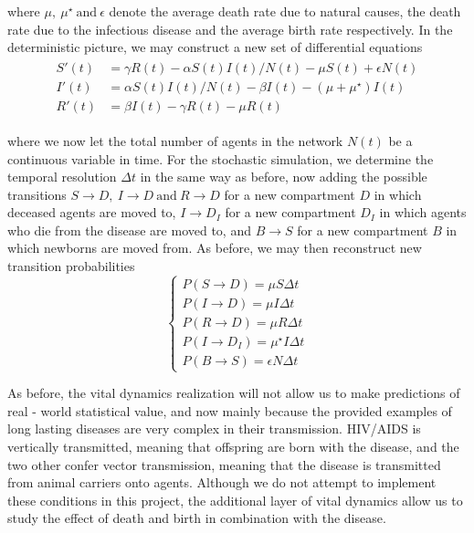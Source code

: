 where $\mu, \ \mu^\star \ \text{and} \ \epsilon$ denote the average death rate due to natural causes, the death rate due to the infectious disease and the average birth rate respectively. In the deterministic picture, we may construct a new set of differential equations
\begin{align}
    \begin{split}
        S'(t) &= \gamma R(t) - \alpha S(t)I(t)/N(t) - \mu S(t) + \epsilon N(t)\\
        I'(t) &= \alpha S(t)I(t)/N(t) - \beta I(t) - (\mu + \mu^\star)I(t)\\
        R'(t) &= \beta I(t) - \gamma R(t) - \mu R(t)
        \label{SIRS}
    \end{split}
\end{align}

where we now let the total number of agents in the network $N(t)$ be a continuous variable in time. For the stochastic simulation, we determine the temporal resolution $\Delta t$ in the same way as before, now adding the possible transitions $S\to D,\ I\to D \ \text{and} \ R \to D$ for a new compartment $D$ in which deceased agents are moved to, $I \to D_I$ for a new compartment $D_I$ in which agents who die from the disease are moved to, and $B \to S$ for a new compartment $B$ in which newborns are moved from. As before, we may then reconstruct new transition probabilities
$$
\begin{cases}
P(S\to D) = \mu S\Delta t\\
P(I\to D) = \mu I\Delta t\\
P(R\to D) = \mu R \Delta t\\
P(I\to D_I) = \mu^\star I \Delta t\\
P(B\to S) = \epsilon N \Delta t
\end{cases}
$$

As before, the vital dynamics realization will not allow us to make predictions of real - world statistical value, and now mainly because the provided examples of long lasting diseases are very complex in their transmission. HIV/AIDS is vertically transmitted, meaning that offspring are born with the disease, and the two other confer vector transmission, meaning that the disease is transmitted from animal carriers onto agents. Although we do not attempt to implement these conditions in this project, the additional layer of vital dynamics allow us to study the effect of death and birth in combination with the disease.\\

